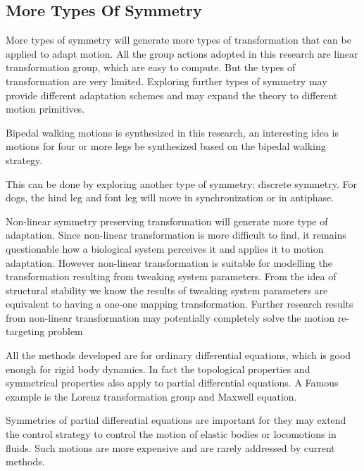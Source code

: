 \subsection{More Types Of Symmetry}
More types of symmetry will generate more types of transformation that can be applied  to adapt motion.
All the group actions adopted in this research are linear transformation group, which are easy to compute.
But the types of transformation are very limited.
Exploring further types of symmetry may provide  different adaptation schemes and may expand the theory to different motion primitives.
\begin{itemize}

Bipedal  walking motions is synthesized in this research, an interesting idea is motions for four or more legs be synthesized based on the bipedal walking strategy.

This can be done by exploring another type of symmetry: discrete symmetry.
For dogs, the hind leg and font leg will move in synchronization or in antiphase.




Non-linear symmetry preserving transformation will generate more type of adaptation.
Since non-linear transformation is more difficult to find, it remains questionable how a biological system perceives it and applies it to motion adaptation.
However non-linear transformation is suitable for modelling the transformation  resulting from tweaking system parameters.
From the idea of structural stability we know the results of tweaking system parameters are equivalent to having a one-one mapping transformation.
Further research results from non-linear transformation may potentially completely solve the motion re-targeting problem 



All the methods developed are for  ordinary differential equations, which is good enough for rigid body dynamics.
In fact the topological properties and symmetrical properties also apply to partial differential equations.
A Famous example is the Lorenz transformation group and Maxwell equation.

Symmetries of partial differential equations are important for they may extend the control strategy  to control the motion of elastic bodies or locomotions in fluids.
Such motions are more expensive  and are rarely addressed by current \cms methods.


\end{itemize}

